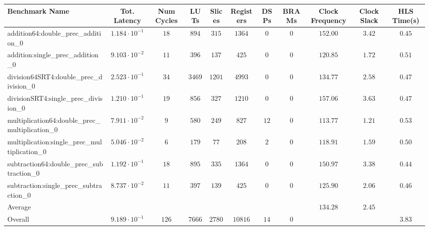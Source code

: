 \begin{tabular}{|l|c|c|c|c|c|c|c|c|c|c|}
\hline
Benchmark Name                                   & Tot. Latency            & Num Cycles & LUTs     & Slices   & Registers & DSPs   & BRAMs & Clock Frequency & Clock Slack & HLS Time(s) \\
\hline
addition64:double\_prec\_addition\_0             & $ 1.184 \cdot 10^{-1} $ & $ 18     $ & $ 894  $ & $ 315  $ & $ 1364  $ & $ 0  $ & $ 0 $ & $ 152.00      $ & $ 3.42    $ & $ 0.45    $ \\
addition:single\_prec\_addition\_0               & $ 9.103 \cdot 10^{-2} $ & $ 11     $ & $ 396  $ & $ 137  $ & $ 425   $ & $ 0  $ & $ 0 $ & $ 120.85      $ & $ 1.72    $ & $ 0.51    $ \\
division64SRT4:double\_prec\_division\_0         & $ 2.523 \cdot 10^{-1} $ & $ 34     $ & $ 3469 $ & $ 1201 $ & $ 4993  $ & $ 0  $ & $ 0 $ & $ 134.77      $ & $ 2.58    $ & $ 0.47    $ \\
divisionSRT4:single\_prec\_division\_0           & $ 1.210 \cdot 10^{-1} $ & $ 19     $ & $ 856  $ & $ 327  $ & $ 1210  $ & $ 0  $ & $ 0 $ & $ 157.06      $ & $ 3.63    $ & $ 0.47    $ \\
multiplication64:double\_prec\_multiplication\_0 & $ 7.911 \cdot 10^{-2} $ & $ 9      $ & $ 580  $ & $ 249  $ & $ 827   $ & $ 12 $ & $ 0 $ & $ 113.77      $ & $ 1.21    $ & $ 0.53    $ \\
multiplication:single\_prec\_multiplication\_0   & $ 5.046 \cdot 10^{-2} $ & $ 6      $ & $ 179  $ & $ 77   $ & $ 208   $ & $ 2  $ & $ 0 $ & $ 118.91      $ & $ 1.59    $ & $ 0.50    $ \\
subtraction64:double\_prec\_subtraction\_0       & $ 1.192 \cdot 10^{-1} $ & $ 18     $ & $ 895  $ & $ 335  $ & $ 1364  $ & $ 0  $ & $ 0 $ & $ 150.97      $ & $ 3.38    $ & $ 0.44    $ \\
subtraction:single\_prec\_subtraction\_0         & $ 8.737 \cdot 10^{-2} $ & $ 11     $ & $ 397  $ & $ 139  $ & $ 425   $ & $ 0  $ & $ 0 $ & $ 125.90      $ & $ 2.06    $ & $ 0.46    $ \\
\hline
Average                                          & $                     $ & $        $ & $      $ & $      $ & $       $ & $    $ & $   $ & $ 134.28      $ & $ 2.45    $ & $         $ \\
\hline
Overall                                          & $ 9.189 \cdot 10^{-1} $ & $ 126    $ & $ 7666 $ & $ 2780 $ & $ 10816 $ & $ 14 $ & $ 0 $ & $             $ & $         $ & $ 3.83    $ \\
\hline
\end{tabular}
